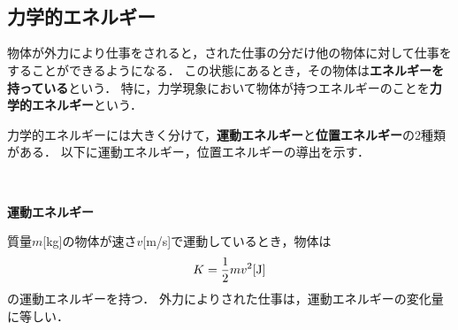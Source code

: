   \ 
%

 \ 
 
\subsection{力学的エネルギー}

物体が外力により仕事をされると，された仕事の分だけ他の物体に対して仕事をすることができるようになる．
この状態にあるとき，その物体は{\bf エネルギーを持っている}という．
特に，力学現象において物体が持つエネルギーのことを{\bf 力学的エネルギー}という．

力学的エネルギーには大きく分けて，{\bf 運動エネルギー}と{\bf 位置エネルギー}の2種類がある．
以下に運動エネルギー，位置エネルギーの導出を示す．

 \ 
 
 {\bf 運動エネルギー}

質量$m$[kg]の物体が速さ$v$[m/s]で運動しているとき，物体は
\[ K=\dfrac{1}{2}mv^2 [{\rm J}]\]
の運動エネルギーを持つ．
外力によりされた仕事は，運動エネルギーの変化量に等しい．

